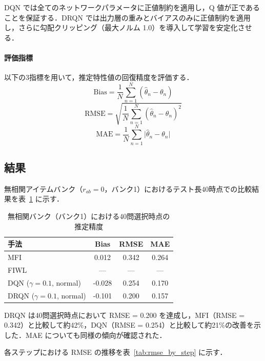 \documentclass[dvipdfmx,a4j]{jarticle}
\begin{document}
DQN では全てのネットワークパラメータに正値制約を適用し，Q 値が正であることを保証する．DRQN では出力層の重みとバイアスのみに正値制約を適用し，さらに勾配クリッピング（最大ノルム 1.0）を導入して学習を安定化させる．

\paragraph{評価指標}
以下の3指標を用いて，推定特性値の回復精度を評価する．
\begin{equation}
\mathrm{Bias} = \frac{1}{N} \sum_{n=1}^{N} (\hat{\theta}_n - \theta_n)
\end{equation}
\begin{equation}
\mathrm{RMSE} = \sqrt{\frac{1}{N} \sum_{n=1}^{N} (\hat{\theta}_n - \theta_n)^2}
\end{equation}
\begin{equation}
\mathrm{MAE} = \frac{1}{N} \sum_{n=1}^{N} \lvert \hat{\theta}_n - \theta_n \rvert
\end{equation}

\subsection{結果}

無相関アイテムバンク（$r_{ab}=0$，バンク1）におけるテスト長40時点での比較結果を表~\ref{tab:step40_results} に示す．

\begin{table}[t]
\centering
\caption{無相関バンク（バンク1）における40問選択時点の推定精度}
\label{tab:step40_results}
\small
\begin{tabular}{lccc}
\toprule
手法 & Bias & RMSE & MAE \\
\midrule
MFI & 0.012 & 0.342 & 0.264 \\
FIWL & --- & --- & --- \\
DQN ($\gamma=0.1$, normal) & -0.028 & 0.254 & 0.170 \\
DRQN ($\gamma=0.1$, normal) & -0.101 & 0.200 & 0.157 \\
\bottomrule
\end{tabular}
\end{table}

DRQN は40問選択時点において RMSE = 0.200 を達成し，MFI（RMSE = 0.342）と比較して約42\%，DQN（RMSE = 0.254）と比較して約21\%の改善を示した．MAE についても同様の傾向が確認された．

各ステップにおける RMSE の推移を表~\ref{tab:rmse_by_step} に示す．
\end{document}
